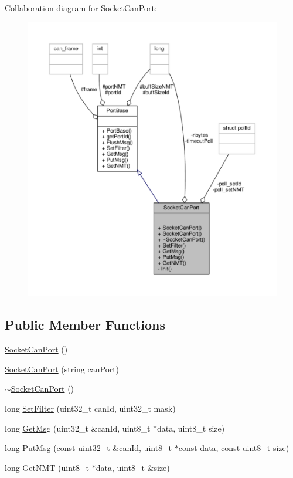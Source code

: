 Collaboration diagram for Socket\+Can\+Port\+:\nopagebreak
\begin{figure}[H]
\begin{center}
\leavevmode
\includegraphics[width=350pt]{classSocketCanPort__coll__graph}
\end{center}
\end{figure}
\subsection*{Public Member Functions}
\begin{DoxyCompactItemize}
\item 
\hyperlink{classSocketCanPort_af3593609acea236b10646732e277837f}{Socket\+Can\+Port} ()
\item 
\hyperlink{classSocketCanPort_a087bc07f3c1658e3cb994d85fcb3da5e}{Socket\+Can\+Port} (string can\+Port)
\item 
\hyperlink{classSocketCanPort_a0d004347e49110daa1ee29e1d1bc85c0}{$\sim$\+Socket\+Can\+Port} ()
\item 
long \hyperlink{classSocketCanPort_a1a5d0866524dae11ddff0d1ac22e0dd5}{Set\+Filter} (uint32\+\_\+t can\+Id, uint32\+\_\+t mask)
\item 
long \hyperlink{classSocketCanPort_a4fe210160e70043ea78443630b9c4e86}{Get\+Msg} (uint32\+\_\+t \&can\+Id, uint8\+\_\+t $\ast$data, uint8\+\_\+t size)
\item 
long \hyperlink{classSocketCanPort_a9375a0c1e33978c83ebd188100898633}{Put\+Msg} (const uint32\+\_\+t \&can\+Id, uint8\+\_\+t $\ast$const data, const uint8\+\_\+t size)
\item 
long \hyperlink{classSocketCanPort_a2efe27bd3bb8c8127c89925e1e21535a}{Get\+N\+MT} (uint8\+\_\+t $\ast$data, uint8\+\_\+t \&size)
\end{DoxyCompactItemize}
